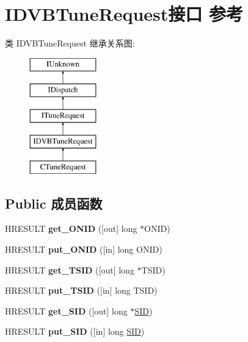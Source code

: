 \hypertarget{interface_i_d_v_b_tune_request}{}\section{I\+D\+V\+B\+Tune\+Request接口 参考}
\label{interface_i_d_v_b_tune_request}
类 I\+D\+V\+B\+Tune\+Request 继承关系图\+:\begin{figure}[H]
\begin{center}
\leavevmode
\includegraphics[height=5.000000cm]{interface_i_d_v_b_tune_request}
\end{center}
\end{figure}
\subsection*{Public 成员函数}
\begin{DoxyCompactItemize}
\item 
\mbox{\label{interface_i_d_v_b_tune_request_a9c470a4ee876dd332705ef602d585a63}} 
H\+R\+E\+S\+U\+LT {\bfseries get\+\_\+\+O\+N\+ID} (\mbox{[}out\mbox{]} long $\ast$O\+N\+ID)
\item 
\mbox{\label{interface_i_d_v_b_tune_request_a6fed7290432f230d1be1110dce9bbd2f}} 
H\+R\+E\+S\+U\+LT {\bfseries put\+\_\+\+O\+N\+ID} (\mbox{[}in\mbox{]} long O\+N\+ID)
\item 
\mbox{\label{interface_i_d_v_b_tune_request_a6bcb79b7def18d70b4d8d707ff94cdb2}} 
H\+R\+E\+S\+U\+LT {\bfseries get\+\_\+\+T\+S\+ID} (\mbox{[}out\mbox{]} long $\ast$T\+S\+ID)
\item 
\mbox{\label{interface_i_d_v_b_tune_request_a445c8d52cf2b45f1660edf895becb69a}} 
H\+R\+E\+S\+U\+LT {\bfseries put\+\_\+\+T\+S\+ID} (\mbox{[}in\mbox{]} long T\+S\+ID)
\item 
\mbox{\label{interface_i_d_v_b_tune_request_aa13fd75694c2e7461f55c133bcc53a07}} 
H\+R\+E\+S\+U\+LT {\bfseries get\+\_\+\+S\+ID} (\mbox{[}out\mbox{]} long $\ast$\hyperlink{struct___s_i_d}{S\+ID})
\item 
\mbox{\label{interface_i_d_v_b_tune_request_a235b3f96967dc01490f49b1b557176a1}} 
H\+R\+E\+S\+U\+LT {\bfseries put\+\_\+\+S\+ID} (\mbox{[}in\mbox{]} long \hyperlink{struct___s_i_d}{S\+ID})
\end{DoxyCompactItemize}
